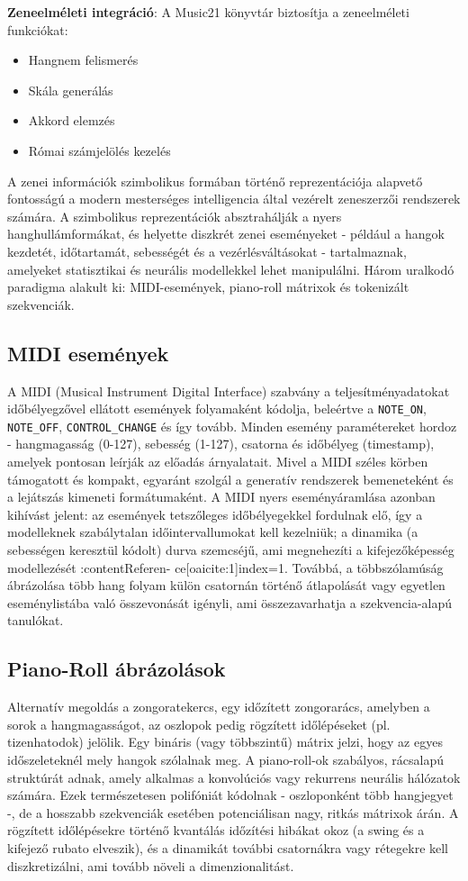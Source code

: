 \textbf{Zeneelméleti integráció}: A Music21 könyvtár biztosítja a zeneelméleti funkciókat:
\begin{itemize}
\item Hangnem felismerés
\item Skála generálás
\item Akkord elemzés
\item Római számjelölés kezelés
\end{itemize}
A zenei információk szimbolikus formában történő reprezentációja alapvető fontosságú a modern
mesterséges intelligencia által vezérelt zeneszerzői rendszerek számára. A szimbolikus reprezentációk
absztrahálják a nyers hanghullámformákat, és helyette diszkrét zenei eseményeket - például a hangok
kezdetét, időtartamát, sebességét és a vezérlésváltásokat - tartalmaznak, amelyeket statisztikai és neurális
modellekkel lehet manipulálni. Három uralkodó paradigma alakult ki: MIDI-események, piano-roll mátrixok és tokenizált szekvenciák.

\subsection{MIDI események}
A MIDI (Musical Instrument Digital Interface) szabvány a teljesítményadatokat időbélyegzővel ellátott
események folyamaként kódolja, beleértve a \texttt{NOTE\_ON}, \texttt{NOTE\_OFF}, \texttt{CONTROL\_CHANGE} és így tovább.  Minden esemény paramétereket hordoz - hangmagasság (0-127), sebesség (1-127), csatorna és időbélyeg (timestamp), amelyek pontosan leírják az előadás árnyalatait. Mivel a MIDI széles körben támogatott és kompakt, egyaránt szolgál a generatív rendszerek bemeneteként és a lejátszás kimeneti formátumaként. A MIDI nyers eseményáramlása azonban kihívást jelent: az események tetszőleges időbélyegekkel fordulnak elő, így a modelleknek szabálytalan időintervallumokat kell kezelniük; a dinamika (a sebességen keresztül kódolt) durva szemcséjű, ami megnehezíti a kifejezőképesség modellezését :contentReferen- ce[oaicite:1]index=1. Továbbá, a többszólamúság ábrázolása több hang folyam külön csatornán történő átlapolását vagy egyetlen eseménylistába való összevonását igényli, ami összezavarhatja a szekvencia-alapú tanulókat.

\subsection{Piano-Roll ábrázolások}
Alternatív megoldás a zongoratekercs, egy időzített zongorarács, amelyben a sorok a hangmagasságot, az oszlopok pedig rögzített időlépéseket (pl. tizenhatodok) jelölik. Egy bináris (vagy többszintű) mátrix jelzi, hogy az egyes időszeleteknél mely hangok szólalnak meg. A piano-roll-ok szabályos, rácsalapú struktúrát adnak, amely alkalmas a konvolúciós vagy rekurrens neurális hálózatok számára. Ezek természetesen polifóniát kódolnak - oszloponként több hangjegyet -, de a hosszabb szekvenciák esetében potenciálisan nagy, ritkás mátrixok árán. A rögzített időlépésekre történő kvantálás időzítési hibákat okoz (a swing és a kifejező rubato elveszik), és a dinamikát további csatornákra vagy rétegekre kell diszkretizálni, ami tovább növeli a dimenzionalitást.

